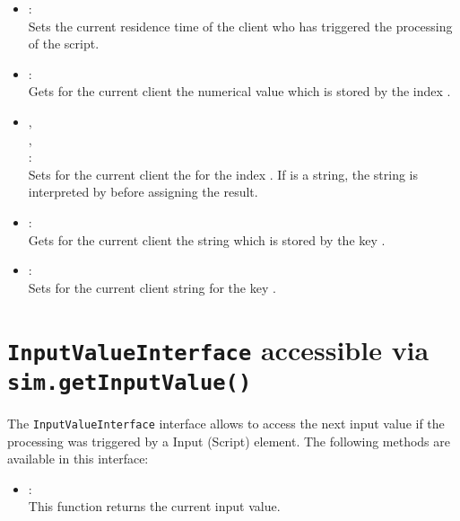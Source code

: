 \begin{itemize}
\item
{}:\\
Sets the current residence time of the client who has triggered the processing of the script.
  
\item
{}:\\
Gets for the current client the numerical value which is stored by the index .
  
\item
{},\\
,\\
:\\
Sets for the current client the  for the index .
If  is a string, the string is interpreted by
 before assigning the result.
  
\item
{}:\\
Gets for the current client the string which is stored by the key .
  
\item
{}:\\
Sets for the current client string  for the key .
	
\end{itemize}



\chapter{\texttt{InputValueInterface} accessible via \texttt{sim.getInputValue()}}

The \texttt{InputValueInterface} interface allows to access the next input value
if the processing was triggered by a Input (Script) element.
The following methods are available in this interface:

\begin{itemize}
\item
{}:\\
This function returns the current input value.
\end{itemize}



